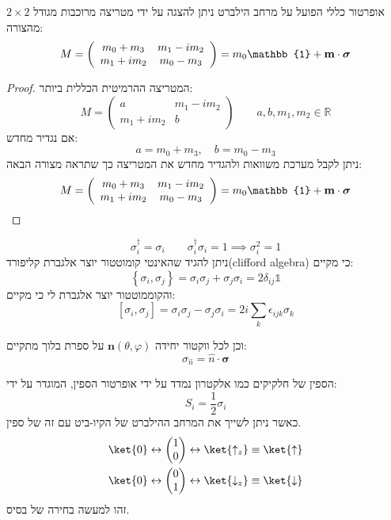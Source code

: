 \documentclass{tstextbook}
\begin{document}
\begin{proposition}
אופרטור כללי הפועל על מרחב הילברט ניתן להצגה על ידי מטריצה מרוכבות מגודל \(2\times 2\) מהצורה:
$$M=\left(\begin{array}{c c}{{m_{0}+m_{3}}}&{{m_{1}-i m_{2}}}\\ {{m_{1}+i m_{2}}}&{{m_{0}-m_{3}}}\end{array}\right)=m_{0}\mathbb{1}+\mathbf{m}\cdot\boldsymbol\sigma$$

\end{proposition}
\begin{proof}
המטריצה ההרמיטית הכללית ביותר:
$$M=\begin{pmatrix}a  & m_{1}-im_{2} \\m_{1}+im_{2} & b
\end{pmatrix}\qquad a,b,m_{1},m_{2} \in \mathbb{R}$$
אם נגדיר מחדש:
$$a=m_{0}+m_{3},\quad b=m_{0}-m_{3}$$
ניתן לקבל מערכת משוואות ולהגדיר מחדש את המטריצה כך שתראה מצורה הבאה:
$$M=\left(\begin{array}{c c}{{m_{0}+m_{3}}}&{{m_{1}-i m_{2}}}\\ {{m_{1}+i m_{2}}}&{{m_{0}-m_{3}}}\end{array}\right)=m_{0}\mathbb{1}+\mathbf{m}\cdot\boldsymbol{\sigma}$$

\end{proof}
\begin{proposition}
$$\sigma_{i}^{\dagger}=\sigma_{i}\qquad \sigma_{i}^{\dagger}\sigma_{i}=1\implies \sigma_{i}^{2}=1$$
ניתן להגיד שהאינטי קומוטטור יוצר אלגברת קליפורד(clifford algebra) כי מקיים:
$$\left\{\sigma_{i},\sigma_{j}\right\}=\sigma_{i}\sigma_{j}+\sigma_{j}\sigma_{i}=2\delta_{i j}\mathbb{1}$$
והקוממוטטור יוצר אלגברת לי כי מקיים:
$$[\sigma_{i},\sigma_{j}]=\sigma_{i}\sigma_{j}-\sigma_{j}\sigma_{i}=2i{\sum_{k}}\epsilon_{i j k}\sigma_{k}$$

\end{proposition}
\begin{definition}
וכן לכל ווקטור יחידה \(\mathbf{n}\left( \theta,\varphi \right)\) על ספרת בלוך מתקיים:
$$\sigma_{\hat{n}}=\hat{n}\cdot \boldsymbol{\sigma}$$

\end{definition}
\begin{definition}
הספין של חלקיקים כמו אלקטרון נמדד על ידי אופרטור הספין, המוגדר על ידי:
$$S_{i}=\frac{1}{2}\sigma_{i}$$
כאשר ניתן לשייך את המרחב ההילברט של הקיו-ביט עם זה של ספין.
$$\begin{gather}\ket{ 0} \leftrightarrow  \begin{pmatrix}1 \\ 0\end{pmatrix} \leftrightarrow  \ket{\uparrow _{z}} \equiv \ket{\uparrow }   \\\ket{ 0} \leftrightarrow  \begin{pmatrix}0 \\ 1\end{pmatrix} \leftrightarrow  \ket{\downarrow _{z}} \equiv \ket{\downarrow } 
\end{gather}$$
זהו למעשה בחירה של בסיס.

\end{definition}
\end{document}
